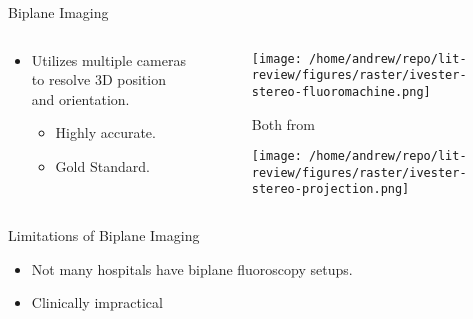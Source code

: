 \documentclass[presentation, aspectratio=1610]{beamer}
\begin{document}
\begin{frame}[label={sec:orgb303897}]{Biplane Imaging}
\begin{columns}
\begin{column}{0.5\columnwidth}
\begin{itemize}
\item Utilizes multiple cameras to resolve 3D position and orientation\autocites{ivesterReconfigurableHighSpeedStereoRadiography2015}[][]{burtonAutomaticTrackingHealthy2021}.
\begin{itemize}
\item Highly accurate.
\item Gold Standard.
\end{itemize}
\end{itemize}
\end{column}
\begin{column}{0.6\columnwidth}
\begin{figure}[htbp]
\centering
\texttt{[image: /home/andrew/repo/lit-review/figures/raster/ivester-stereo-fluoromachine.png]}
\caption{Both from \autocite{ivesterReconfigurableHighSpeedStereoRadiography2015}}
\end{figure}
\vspace{-0.25in}
\begin{figure}[htbp]
\centering
\texttt{[image: /home/andrew/repo/lit-review/figures/raster/ivester-stereo-projection.png]}
\end{figure}
\end{column}
\end{columns}
\end{frame}
\begin{frame}[label={sec:org2ca8bf0}]{Limitations of Biplane Imaging}
\begin{itemize}
\item Not many hospitals have biplane fluoroscopy setups.
\item Clinically impractical
\end{itemize}
\end{frame}
\end{document}
